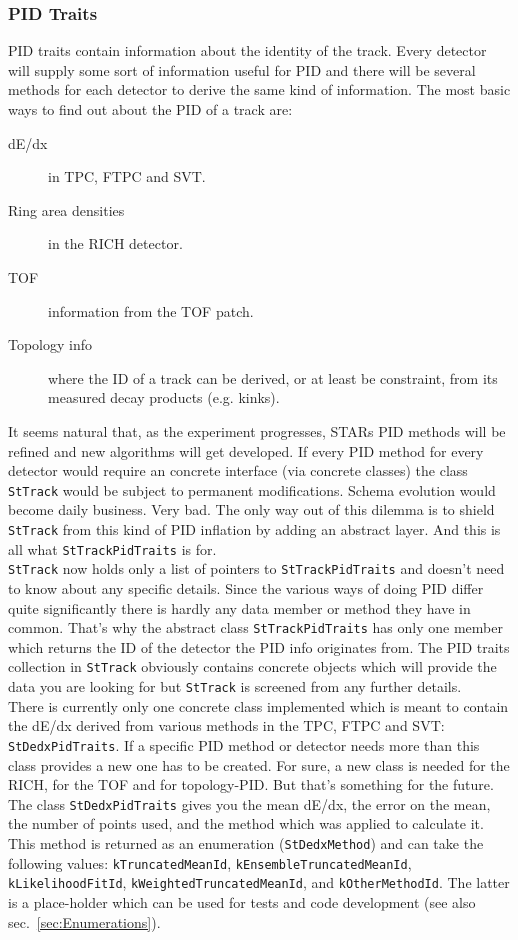 \documentclass[twoside]{article}
\begin{document}
\subsubsection{PID Traits}
\label{sec:pidTraits}
PID traits contain information about the identity of the track. Every
detector will supply some sort of information useful for PID and there
will be several methods for each detector to derive the same kind of
information. The most basic ways to find out about the PID of a track
are:
\begin{description}
\item[dE/dx] in TPC, FTPC and SVT.
\item[Ring area densities] in the RICH detector.
\item[TOF] information from the TOF patch.
\item[Topology info] where the ID of a track can be derived, or at
    least be constraint, from its measured decay products (e.g.
    kinks).
\end{description}
It seems natural that, as the experiment progresses, STARs PID methods
will be refined and new algorithms will get developed. If every PID
method for every detector would require an concrete interface (via
concrete classes) the class \texttt{StTrack} would be subject to
permanent modifications. Schema evolution would become daily business.
Very bad.  The only way out of this dilemma is to shield
\texttt{StTrack} from this kind of PID inflation by adding
an abstract layer. And this is all what \texttt{StTrackPidTraits} is for.\\
\texttt{StTrack} now holds only a list of pointers to
\texttt{StTrackPidTraits} and doesn't need to know about any specific
details. Since the various ways of doing PID differ quite
significantly there is hardly any data member or method they have in
common.  That's why the abstract class \texttt{StTrackPidTraits} has
only one member which returns the ID of the detector the PID info
originates from.  The PID traits collection in \texttt{StTrack}
obviously contains concrete objects which will provide the data you
are looking for but \texttt{StTrack} is screened from any further details. \\
There is currently only one concrete class implemented which is meant
to contain the dE/dx derived from various methods in the TPC, FTPC and
SVT: \texttt{StDedxPidTraits}. If a specific PID method or detector
needs more than this class provides a new one has to be created. For
sure, a new class is needed for the RICH, for the TOF and for
topology-PID.  But that's something
for the future.\\
The class \texttt{StDedxPidTraits} gives you the mean dE/dx, the error
on the mean, the number of points used, and the method which was applied to
calculate it.  This method is returned as an enumeration
(\texttt{StDedxMethod}) and can take the following values:
\texttt{kTruncatedMeanId}, \texttt{kEnsembleTruncatedMeanId},
\texttt{kLikelihoodFitId}, \texttt{kWeightedTruncatedMeanId}, and
\texttt{kOtherMethodId}. The latter is a place-holder which can be
used for tests and code development (see also
sec.~\ref{sec:Enumerations}).
\end{document}
